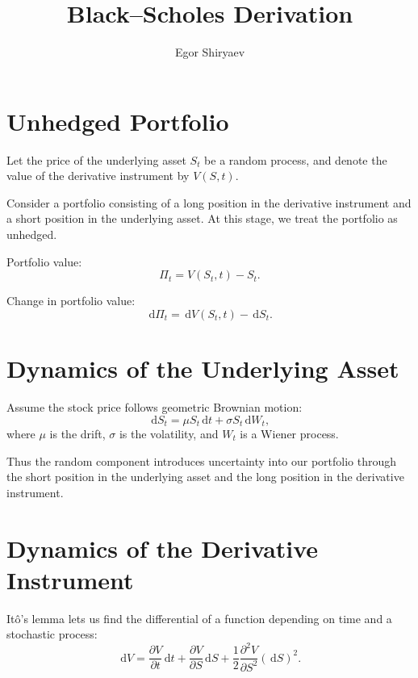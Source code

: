 \documentclass[12pt]{article}
\title{Black--Scholes Derivation}
\author{Egor Shiryaev}
\date{}
\newcommand{\dd}{\,\mathrm{d}}
\newcommand{\pd}[2]{\frac{\partial #1}{\partial #2}}
\newcommand{\pdd}[2]{\frac{\partial^2 #1}{\partial #2^2}}
\begin{document}
\maketitle

\section{Unhedged Portfolio}

Let the price of the underlying asset $S_t$ be a random process,
and denote the value of the derivative instrument by $V(S,t)$.

Consider a portfolio consisting of a long position in the derivative instrument
and a short position in the underlying asset. At this stage, we treat the
portfolio as unhedged.

Portfolio value:
\begin{equation}
\Pi_t = V(S_t,t) - S_t.
\end{equation}

Change in portfolio value:
\begin{equation}
\dd \Pi_t = \dd V(S_t,t) - \dd S_t.
\end{equation}

\section{Dynamics of the Underlying Asset}

Assume the stock price follows geometric Brownian motion:
\begin{equation}
\dd S_t = \mu S_t \dd t + \sigma S_t \dd W_t,
\end{equation}
where $\mu$ is the drift, $\sigma$ is the volatility,
and $W_t$ is a Wiener process.

Thus the random component introduces uncertainty into our portfolio through the
short position in the underlying asset and the long position in the derivative
instrument.

\section{Dynamics of the Derivative Instrument}

It\^o's lemma lets us find the differential of a function depending on time
and a stochastic process:
\begin{equation}
\dd V = \pd{V}{t}\dd t + \pd{V}{S}\dd S + \frac{1}{2}\pdd{V}{S}(\dd S)^2.
\end{equation}
\end{document}
